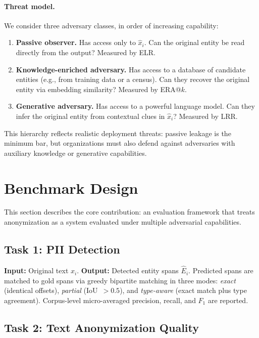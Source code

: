 \documentclass[10pt,twocolumn]{article}
\begin{document}
\paragraph{Threat model.}
We consider three adversary classes, in order of increasing capability:
\begin{enumerate}
\item \textbf{Passive observer.} Has access only to $\hat{x}_i$. Can the original entity be read directly from the output? Measured by ELR.
\item \textbf{Knowledge-enriched adversary.} Has access to a database of candidate entities (e.g., from training data or a census). Can they recover the original entity via embedding similarity? Measured by ERA@$k$.
\item \textbf{Generative adversary.} Has access to a powerful language model. Can they infer the original entity from contextual clues in $\hat{x}_i$? Measured by LRR.
\end{enumerate}

This hierarchy reflects realistic deployment threats: passive leakage is the minimum bar, but organizations must also defend against adversaries with auxiliary knowledge or generative capabilities.

\section{Benchmark Design}\label{sec:benchmark}

This section describes the core contribution: an evaluation framework that treats anonymization as a system evaluated under multiple adversarial capabilities.

\subsection{Task 1: PII Detection}

\textbf{Input:} Original text $x_i$. \textbf{Output:} Detected entity spans $\hat{E}_i$.
Predicted spans are matched to gold spans via greedy bipartite matching in three modes: \emph{exact} (identical offsets), \emph{partial} (IoU~$>0.5$), and \emph{type-aware} (exact match plus type agreement).
Corpus-level micro-averaged precision, recall, and $F_1$ are reported.

\subsection{Task 2: Text Anonymization Quality}
\end{document}

